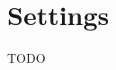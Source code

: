 \documentclass[FIPLY_base.tex]{subfiles}
\author{Andreas Denkmayr}
\date{25. Februar 2016}
\begin{document}
\section{Settings}
TODO
\end{document}
